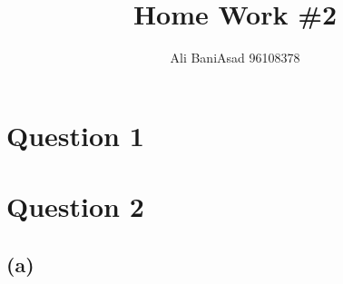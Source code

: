 \documentclass{article}
\title{Home Work \#2}
\author{Ali BaniAsad 96108378}
\begin{document}
	\maketitle
	\section*{Question 1}
	
	\section*{Question 2}
	\subsection*{(a)}
	
\end{document}
